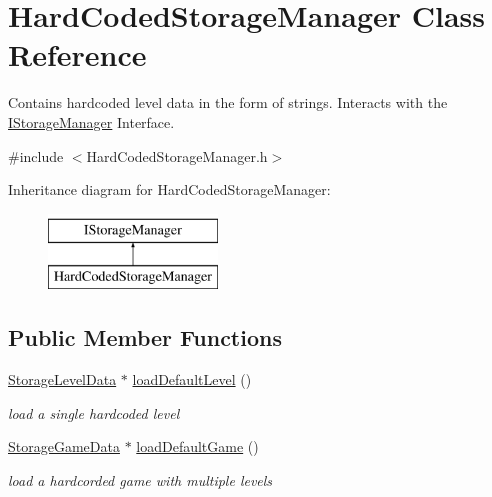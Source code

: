 \hypertarget{class_hard_coded_storage_manager}{}\section{Hard\+Coded\+Storage\+Manager Class Reference}
\label{class_hard_coded_storage_manager}


Contains hardcoded level data in the form of strings. Interacts with the \mbox{\hyperlink{class_i_storage_manager}{I\+Storage\+Manager}} Interface.  




{\ttfamily \#include $<$Hard\+Coded\+Storage\+Manager.\+h$>$}

Inheritance diagram for Hard\+Coded\+Storage\+Manager\+:\begin{figure}[H]
\begin{center}
\leavevmode
\includegraphics[height=2.000000cm]{class_hard_coded_storage_manager}
\end{center}
\end{figure}
\subsection*{Public Member Functions}
\begin{DoxyCompactItemize}
\item 
\mbox{\label{class_hard_coded_storage_manager_acfe4d38c419fafa983a2081ee002005b}} 
\mbox{\hyperlink{class_storage_level_data}{Storage\+Level\+Data}} $\ast$ \mbox{\hyperlink{class_hard_coded_storage_manager_acfe4d38c419fafa983a2081ee002005b}{load\+Default\+Level}} ()
\begin{DoxyCompactList}\small\item\em load a single hardcoded level \end{DoxyCompactList}\item 
\mbox{\label{class_hard_coded_storage_manager_a648f4c3b2e6de65fc4603e9ce4d5fc6d}} 
\mbox{\hyperlink{class_storage_game_data}{Storage\+Game\+Data}} $\ast$ \mbox{\hyperlink{class_hard_coded_storage_manager_a648f4c3b2e6de65fc4603e9ce4d5fc6d}{load\+Default\+Game}} ()
\begin{DoxyCompactList}\small\item\em load a hardcorded game with multiple levels \end{DoxyCompactList}\end{DoxyCompactItemize}


